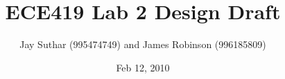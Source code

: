 \documentclass[12pt]{article}
\begin{document}
\title{ECE419 Lab 2 Design Draft}

\author{Jay Suthar (995474749) and James Robinson (996185809)}

\date{Feb 12, 2010}

\maketitle
\end{document}
